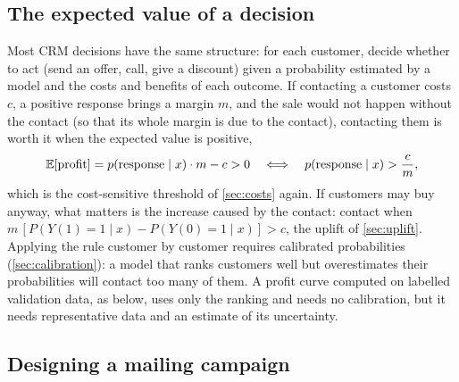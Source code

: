 \subsection{The expected value of a decision}

Most CRM decisions have the same structure: for each customer, decide whether to act (send an offer, call, give a
discount) given a probability estimated by a model and the costs and benefits of each outcome. If contacting a customer
costs $c$, a positive response brings a margin $m$, and the sale would not happen without the contact (so that its
whole margin is due to the contact), contacting them is worth it when the expected value is positive,
\begin{equation}\label{eq:expectedvalue}
  \mathbb{E}[\text{profit}]=p(\text{response}\mid x)\cdot m-c>0
  \quad\Longleftrightarrow\quad
  p(\text{response}\mid x)>\frac{c}{m},
\end{equation}
which is the cost-sensitive threshold of \cref{sec:costs} again. If customers may buy anyway, what matters is the increase
caused by the contact: contact when $m\,[P(Y(1)=1\mid x)-P(Y(0)=1\mid x)]>c$, the uplift of \cref{sec:uplift}. Applying
the rule customer by customer requires calibrated probabilities (\cref{sec:calibration}): a model that ranks customers
well but overestimates their probabilities will contact too many of them. A profit curve computed on labelled
validation data, as below, uses only the ranking and needs no calibration, but it needs representative data and an
estimate of its uncertainty.

\subsection{Designing a mailing campaign}

